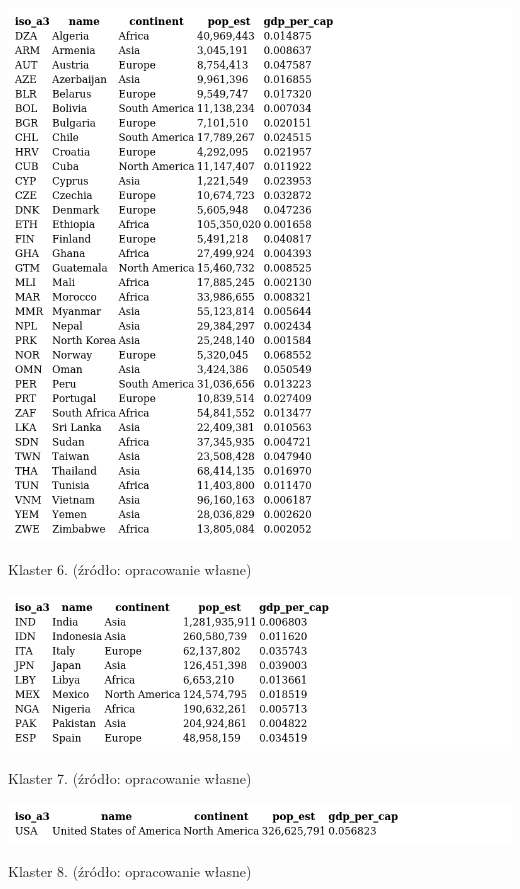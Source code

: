 \documentclass[11pt]{report}
\begin{document}
    \begin{table}[!htp]
        \centering
        \includegraphics[width=\linewidth]{tables/CLUST/clust6kmeans.png}
        \caption{Klaster 6. (źródło: opracowanie własne)}
        \label{tab:cl6}
    \end{table}

    \begin{table}[!htp]
        \centering
        \includegraphics[width=\linewidth]{tables/CLUST/clust7kmeans.png}
        \caption{Klaster 7. (źródło: opracowanie własne)}
        \label{tab:cl7}
    \end{table}

    \begin{table}[!htp]
        \centering
        \includegraphics[width=\linewidth]{tables/CLUST/clust8kmeans.png}
        \caption{Klaster 8. (źródło: opracowanie własne)}
        \label{tab:cl8}
    \end{table}
\end{document}

